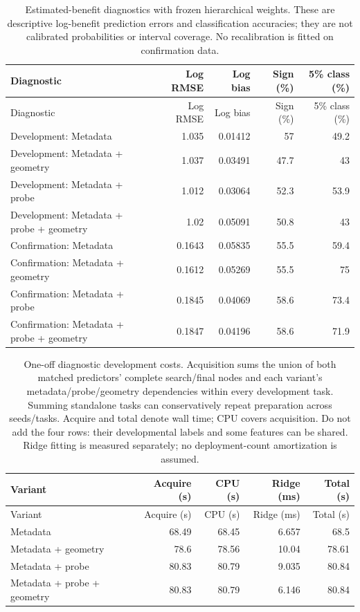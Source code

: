 {\small\setlength{\tabcolsep}{4pt}
\begin{longtable}{lrrrr}
\caption{Estimated-benefit diagnostics with frozen hierarchical weights. These are descriptive log-benefit prediction errors and classification accuracies; they are not calibrated probabilities or interval coverage. No recalibration is fitted on confirmation data.}\label{tab:diagnostic-calibration}\\
\toprule
Diagnostic & Log RMSE & Log bias & Sign (\%) & 5\% class (\%) \\
\midrule
\endfirsthead
\toprule
Diagnostic & Log RMSE & Log bias & Sign (\%) & 5\% class (\%) \\
\midrule
\endhead
Development: Metadata & 1.035 & 0.01412 & 57 & 49.2 \\
Development: Metadata + geometry & 1.037 & 0.03491 & 47.7 & 43 \\
Development: Metadata + probe & 1.012 & 0.03064 & 52.3 & 53.9 \\
Development: Metadata + probe + geometry & 1.02 & 0.05091 & 50.8 & 43 \\
Confirmation: Metadata & 0.1643 & 0.05835 & 55.5 & 59.4 \\
Confirmation: Metadata + geometry & 0.1612 & 0.05269 & 55.5 & 75 \\
Confirmation: Metadata + probe & 0.1845 & 0.04069 & 58.6 & 73.4 \\
Confirmation: Metadata + probe + geometry & 0.1847 & 0.04196 & 58.6 & 71.9 \\
\bottomrule
\end{longtable}
}

{\small\setlength{\tabcolsep}{4pt}
\begin{longtable}{lrrrr}
\caption{One-off diagnostic development costs. Acquisition sums the union of both matched predictors' complete search/final nodes and each variant's metadata/probe/geometry dependencies within every development task. Summing standalone tasks can conservatively repeat preparation across seeds/tasks. Acquire and total denote wall time; CPU covers acquisition. Do not add the four rows: their developmental labels and some features can be shared. Ridge fitting is measured separately; no deployment-count amortization is assumed.}\label{tab:offline-costs}\\
\toprule
Variant & Acquire (s) & CPU (s) & Ridge (ms) & Total (s) \\
\midrule
\endfirsthead
\toprule
Variant & Acquire (s) & CPU (s) & Ridge (ms) & Total (s) \\
\midrule
\endhead
Metadata & 68.49 & 68.45 & 6.657 & 68.5 \\
Metadata + geometry & 78.6 & 78.56 & 10.04 & 78.61 \\
Metadata + probe & 80.83 & 80.79 & 9.035 & 80.84 \\
Metadata + probe + geometry & 80.83 & 80.79 & 6.146 & 80.84 \\
\bottomrule
\end{longtable}
}

